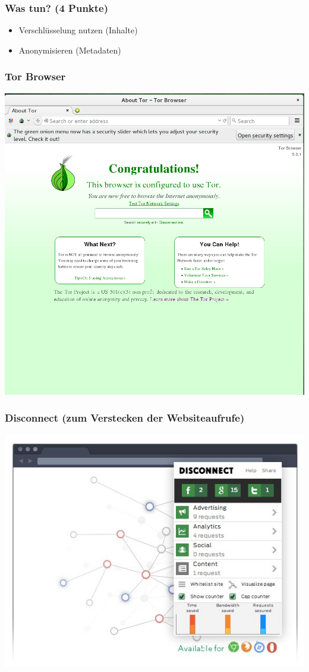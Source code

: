\documentclass[12pt]{beamer}
\begin{document}
\begin{frame}
  \frametitle{Was tun? (4 Punkte)}
  \begin{itemize}
    \item Verschlüsselung nutzen (Inhalte)
    \item Anonymisieren (Metadaten)
  \end{itemize}
\end{frame}
 
\begin{frame}
  \frametitle{Tor Browser}
  \begin{center}
    \includegraphics[height=0.8\textheight]{img/torbrowser1.png}
  \end{center}
\end{frame}

\begin{frame}
  \frametitle{Disconnect (zum Verstecken der Websiteaufrufe)}
  \begin{center}
    \includegraphics[height=0.7\textheight]{img/disconnectme.jpg}
  \end{center}
\end{frame}
\end{document}
